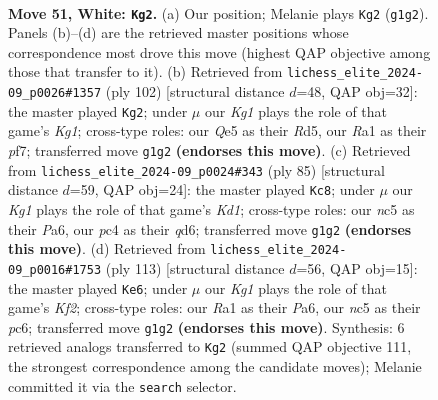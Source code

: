 \documentclass[11pt]{article}
\begin{document}
\clearpage

\begin{figure}[p]\centering
\begin{subfigure}{0.46\textwidth}\centering
\resizebox{\linewidth}{!}{%
\newchessgame
\chessboard[
  setfen={6k1/p2r4/1p6/2n1Qp1q/P1p5/6P1/1P6/R4RK1 w - - 0 51},
  showmover=false,
  pgfstyle=straightmove, color=movearrow, markmove={g1-g2}
]}
\caption{}
\end{subfigure}\hfill
\begin{subfigure}{0.46\textwidth}\centering
\resizebox{\linewidth}{!}{%
\newchessgame
\chessboard[
  setfen={8/2q2p1k/1p6/2nR4/p1Q1P3/P4PP1/8/3R2K1 w - - 1 52},
  showmover=false,
  pgfstyle=straightmove, color=movearrow, markmove={g1-g2}
]}
\caption{}
\end{subfigure}
\\[4pt]
\begin{subfigure}{0.46\textwidth}\centering
\resizebox{\linewidth}{!}{%
\newchessgame
\chessboard[
  setfen={3kr3/1p6/p2Q4/3P4/8/7P/PP2pqP1/4R2K b - - 10 43},
  showmover=false,
  pgfstyle=straightmove, color=movearrow, markmove={d8-c8}
]}
\caption{}
\end{subfigure}\hfill
\begin{subfigure}{0.46\textwidth}\centering
\resizebox{\linewidth}{!}{%
\newchessgame
\chessboard[
  setfen={8/4rkQ1/p1Pp4/2q1p2N/p7/7P/1P3PP1/6K1 b - - 6 57},
  showmover=false,
  pgfstyle=straightmove, color=movearrow, markmove={f7-e6}
]}
\caption{}
\end{subfigure}
\caption{\textbf{Move 51, White: \texttt{Kg2}.} (a) Our position; Melanie plays \texttt{Kg2} (\texttt{g1g2}). Panels (b)--(d) are the retrieved master positions whose correspondence most drove this move (highest QAP objective among those that transfer to it). (b) Retrieved from \texttt{lichess\_elite\_2024-09\_p0026\#1357} (ply 102) [structural distance $d$=48, QAP obj=32]: the master played \texttt{Kg2}; under $\mu$ our \emph{Kg1} plays the role of that game's \emph{Kg1}; cross-type roles: our \emph{Q}e5 as their \emph{R}d5, our \emph{R}a1 as their \emph{p}f7; transferred move \texttt{g1g2} \textbf{(endorses this move)}. (c) Retrieved from \texttt{lichess\_elite\_2024-09\_p0024\#343} (ply 85) [structural distance $d$=59, QAP obj=24]: the master played \texttt{Kc8}; under $\mu$ our \emph{Kg1} plays the role of that game's \emph{Kd1}; cross-type roles: our \emph{n}c5 as their \emph{P}a6, our \emph{p}c4 as their \emph{q}d6; transferred move \texttt{g1g2} \textbf{(endorses this move)}. (d) Retrieved from \texttt{lichess\_elite\_2024-09\_p0016\#1753} (ply 113) [structural distance $d$=56, QAP obj=15]: the master played \texttt{Ke6}; under $\mu$ our \emph{Kg1} plays the role of that game's \emph{Kf2}; cross-type roles: our \emph{R}a1 as their \emph{P}a6, our \emph{n}c5 as their \emph{p}c6; transferred move \texttt{g1g2} \textbf{(endorses this move)}. Synthesis: 6 retrieved analogs transferred to \texttt{Kg2} (summed QAP objective 111, the strongest correspondence among the candidate moves); Melanie committed it via the \texttt{search} selector.}
\label{fig:thought-m100}
\end{figure}
\end{document}
